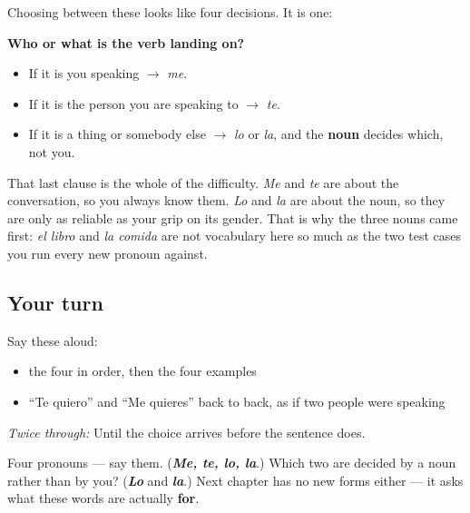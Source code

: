 \begin{grammarlens}[title={Grammar Lens: the single question}]
Choosing between these looks like four decisions. It is one:

\textbf{Who or what is the verb landing on?}

\begin{itemize}
\raggedright
  \item If it is you speaking $\to$ \emph{me}.
  \item If it is the person you are speaking to $\to$ \emph{te}.
  \item If it is a thing or somebody else $\to$ \emph{lo} or \emph{la}, and the \textbf{noun} decides which, not you.
\end{itemize}

That last clause is the whole of the difficulty. \emph{Me} and \emph{te} are about the conversation, so you always know them. \emph{Lo} and \emph{la} are about the noun, so they are only as reliable as your grip on its gender. That is why the three nouns came first: \emph{el libro} and \emph{la comida} are not vocabulary here so much as the two test cases you run every new pronoun against.
\end{grammarlens}

\subsection*{Your turn}
Say these aloud:

\begin{itemize}
\raggedright
  \item the four in order, then the four examples
  \item \textquotedblleft{}Te quiero\textquotedblright{} and \textquotedblleft{}Me quieres\textquotedblright{} back to back, as if two people were speaking
\end{itemize}

\emph{Twice through:} Until the choice arrives before the sentence does.

\begin{tcolorbox}[breakable,colback=teal!4,colframe=teal!35!black,title={Before you move on}]
Four pronouns — say them. (\emph{\textbf{Me, te, lo, la}}.) Which two are decided by a noun rather than by you? (\emph{\textbf{Lo}} and \emph{\textbf{la}}.) Next chapter has no new forms either — it asks what these words are actually \textbf{for}.
\end{tcolorbox}

